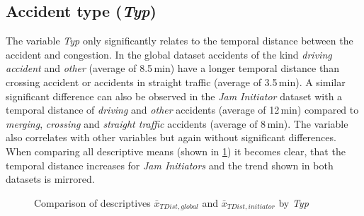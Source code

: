 \subsection{Accident type (\textit{Typ})}
\label{analysis_sum_Typ}
The variable \textit{Typ} only significantly relates to the temporal distance between the accident and congestion. In the global dataset accidents of the kind \textit{driving accident} and \textit{other} (average of 8.5\,min) have a longer temporal distance than crossing accident or accidents in straight traffic (average of 3.5\,min). A similar significant difference can also be observed in the \textit{Jam Initiator} dataset with a temporal distance of \textit{driving} and \textit{other} accidents (average of 12\,min) compared to \textit{merging}, \textit{crossing} and \textit{straight traffic} accidents (average of 8\,min). The variable also correlates with other variables but again without significant differences. When comparing all descriptive means (shown in \cref{fig:baysis_summary_Typ_TDist_barplot}) it becomes clear, that the temporal distance increases for \textit{Jam Initiators}
and the trend shown in both datasets is mirrored.
\begin{figure}[ht!]
    \data
    \pgfplotstablesort[sort key=means, sort cmp=float >]{\datasorted}{\data}
    \tiny
    \centering
    \caption{Comparison of descriptives $\bar{x}_{TDist,global}$ and $\bar{x}_{TDist,initiator}$ by \textit{Typ}}
    \label{fig:baysis_summary_Typ_TDist_barplot}
\end{figure}

